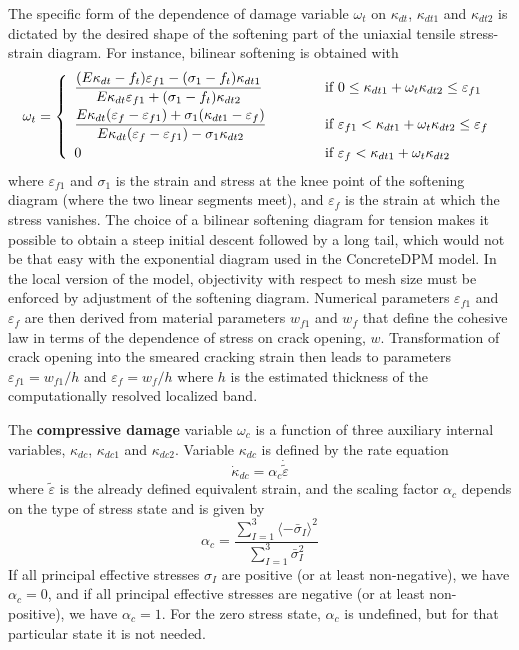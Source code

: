 \documentclass[a4paper]{article}
\begin{document}
The specific form of the dependence of damage variable $\omega_t$ on 
$\kappa_{dt}$, $\kappa_{dt1}$ and $\kappa_{dt2}$ is dictated by the desired
shape of the softening part of the uniaxial tensile stress-strain diagram.
For instance, bilinear softening is obtained with
\begin{equation}\label{cdpm2:omegat}
  \omega_t = \left\{\begin{array}{ll}
  \dfrac{(E\kappa_{dt}-f_t)\varepsilon_{f1}-(\sigma_1-f_t)\kappa_{dt1}}{E\kappa_{dt}\varepsilon_{f1}+(\sigma_1-f_t)\kappa_{dt2}} & \hskip 10mm \mbox{ if } 0\le\kappa_{dt1}+\omega_t\kappa_{dt2}\le\varepsilon_{f1}
  \\[3mm]
    \dfrac{E\kappa_{dt}(\varepsilon_f-\varepsilon_{f1})+\sigma_1(\kappa_{dt1}-\varepsilon_f)}{E\kappa_{dt}(\varepsilon_f-\varepsilon_{f1})-\sigma_1\kappa_{dt2}} & \hskip 10mm \mbox{ if } \varepsilon_{f1}<\kappa_{dt1}+\omega_t\kappa_{dt2}\le\varepsilon_{f}
    \\[3mm]
    0 & \hskip 10mm \mbox{ if } \varepsilon_{f}<\kappa_{dt1}+\omega_t\kappa_{dt2}
  \end{array}\right.
\end{equation}
where $\varepsilon_{f1}$ and $\sigma_1$ is the strain and stress at the knee point
of the softening diagram (where the two linear segments meet), and $\varepsilon_{f}$
is the strain at which the stress vanishes. The choice of a bilinear softening
diagram for tension makes it possible to obtain a steep initial descent
followed by a long tail, which would not be that easy with the exponential diagram
used in the ConcreteDPM model. In the local version of the model, objectivity
with respect to mesh size must be enforced by adjustment of the softening diagram.
Numerical parameters $\varepsilon_{f1}$ and $\varepsilon_{f}$ are then derived from material
parameters $w_{f1}$ and $w_f$ that define the cohesive law in terms of the dependence of stress
on crack opening, $w$. Transformation of crack opening into the smeared cracking strain
then leads to parameters $\varepsilon_{f1}=w_{f1}/h$ and $\varepsilon_{f}=w_f/h$ where
$h$ is the estimated thickness of the computationally resolved localized band.

The {\bf compressive damage} variable $\omega_c$ is a function of three auxiliary
internal variables, $\kappa_{dc}$, $\kappa_{dc1}$ and $\kappa_{dc2}$.
Variable $\kappa_{dc}$ is defined by the rate equation
\begin{equation}
  \dot\kappa_{dc} = \alpha_c\dot{\tilde\varepsilon}
\end{equation}
where $\tilde\varepsilon$ is the already defined equivalent strain, and
the scaling factor $\alpha_c$ depends on the type of stress state
and is given by
\begin{equation}
  \alpha_c = \frac{\sum_{I=1}^3 \langle-\bar\sigma_I\rangle^2}{\sum_{I=1}^3 \bar\sigma_I^2}
\end{equation}
If all principal effective stresses $\sigma_I$ are positive (or at least non-negative),
we have $\alpha_c=0$, and if all principal effective stresses are negative (or at least non-positive),
we have $\alpha_c=1$. For the zero stress state, $\alpha_c$ is undefined, but for that
particular state it is not needed. 
\end{document}

